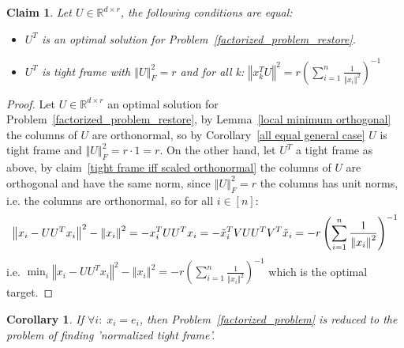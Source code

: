 \documentclass{article}
\newtheorem{corollary}{Corollary}
\newtheorem{claim}{Claim}
\newcommand{\probref}[1]{Problem~\ref{#1}}
\newcommand{\cororef}[1]{Corollary~\ref{#1}}
\newcommand{\claimref}[1]{claim~\ref{#1}}
\newcommand{\Lemmaref}[1]{Lemma~\ref{#1}}
\begin{document}
\begin{claim} \label{tight frame iff orthonormal}
Let $U\in\mathbb{R}^{d\times r}$, the following conditions are equal:
\begin{itemize}
    \item $U^T$ is an optimal solution for \probref{factorized_problem_restore}.
    \item $U^T$ is tight frame with $\left\Vert U\right\Vert_F^2=r$ and for all k: $\left\Vert x_k^TU\right\Vert^2=r\left({\sum_{i=1}^n \frac{1}{\left\Vert x_{i}\right\Vert^{2}}}\right)^{-1}$
\end{itemize}

\end{claim}
\begin{proof}

Let $U\in\mathbb{R}^{d\times r}$ an optimal solution for \probref{factorized_problem_restore}, by \Lemmaref{local minimum orthogonal} the columns of $U$ are orthonormal, so by \cororef{all equal general case} $U$ is tight frame and $\left\Vert U\right\Vert_F^2=r\cdot1=r$.
On the other hand, let $U^T$ a tight frame as above, by \claimref{tight frame iff scaled orthonormal} the columns of $U$ are orthogonal and have the same norm, since $\left\Vert U\right\Vert_F^2=r$ the columns has unit norms, i.e. the columns are orthonormal, so for all $i\in[n]$:
\begin{align*}
    \left\Vert x_i-UU^Tx_i\right\Vert^2- \left\Vert x_{i}\right\Vert ^{2}
    =-x_{i}^TUU^Tx_{i}
    =-\Tilde{x}_{i}^TVUU^TV^T\Tilde{x}_{i}
    =-r\left({\sum_{i=1}^n \frac{1}{\left\Vert x_{i}\right\Vert^{2}}}\right)^{-1}
\end{align*}
i.e. $\min_i\left\Vert x_i-UU^Tx_i\right\Vert^2-\left\Vert x_{i}\right\Vert^{2}=-r\left({\sum_{i=1}^n \frac{1}{\left\Vert x_{i}\right\Vert^{2}}}\right)^{-1}$ which is the optimal target.
\end{proof}

\begin{corollary}
If $\forall i:\; x_i=e_i$, then \probref{factorized_problem} is reduced to the problem of finding 'normalized tight frame'.
\end{corollary}

\end{document}
